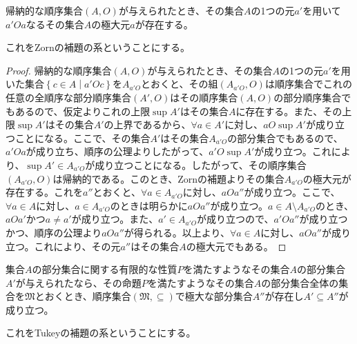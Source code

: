 \documentclass[dvipdfmx]{jsarticle}
\begin{document}
\begin{thm}[Zornの補題の系]\label{1.3.3.7}
帰納的な順序集合$(A,O)$が与えられたとき、その集合$A$の1つの元$a'$を用いて$a'Oa$なるその集合$A$の極大元$a$が存在する。
\end{thm}\par
これをZornの補題の系ということにする。
\begin{proof}
帰納的な順序集合$(A,O)$が与えられたとき、その集合$A$の1つの元$a'$を用いた集合$\left\{ c \in A \middle| a'Oc \right\}$を$A_{a'O}$とおくと、その組$\left( A_{a'O},O \right)$は順序集合でこれの任意の全順序な部分順序集合$\left( A',O \right)$はその順序集合$(A,O)$の部分順序集合でもあるので、仮定よりこれの上限$\sup A'$はその集合$A$に存在する。また、その上限$\sup A'$はその集合$A'$の上界であるから、$\forall a \in A'$に対し、$aO\sup A'$が成り立つことになる。ここで、その集合$A'$はその集合$A_{a'O}$の部分集合でもあるので、$a'Oa$が成り立ち、順序の公理よりしたがって、$a'O\sup A'$が成り立つ。これにより、$\sup A' \in A_{a'O}$が成り立つことになる。したがって、その順序集合$\left( A_{a'O},O \right)$は帰納的である。このとき、Zornの補題よりその集合$A_{a'O}$の極大元が存在する。これを$a''$とおくと、$\forall a \in A_{a'O}$に対し、$aOa''$が成り立つ。ここで、$\forall a \in A$に対し、$a \in A_{a'O}$のときは明らかに$aOa''$が成り立つ。$a \in A \setminus A_{a'O}$のとき、$aOa'$かつ$a \neq a'$が成り立つ。また、$a' \in A_{a'O}$が成り立つので、$a'Oa''$が成り立つかつ、順序の公理より$aOa''$が得られる。以上より、$\forall a \in A$に対し、$aOa''$が成り立つ。これにより、その元$a''$はその集合$A$の極大元でもある。
\end{proof}
\begin{thm}[Tukeyの補題の系]\label{1.3.3.8}
集合$A$の部分集合に関する有限的な性質$P$を満たすようなその集合$A$の部分集合$A'$が与えられたなら、その命題$P$を満たすようなその集合$A$の部分集合全体の集合を$\mathfrak{M}$とおくとき、順序集合$\mathfrak{(M, \subseteq )}$で極大な部分集合$A''$が存在し$A' \subseteq A''$が成り立つ。
\end{thm}\par
これをTukeyの補題の系ということにする。
\end{document}
